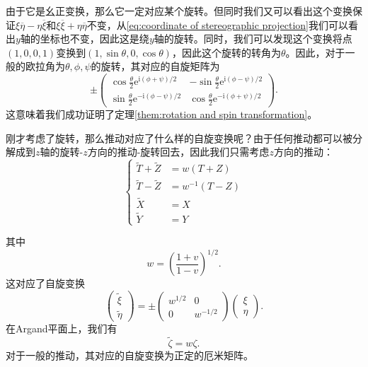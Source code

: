 由于它是幺正变换，那么它一定对应某个旋转。但同时我们又可以看出这个变换保证$\xi \overline{\eta } -\eta \overline{\xi }$和$\xi \overline{\xi } +\eta \overline{\eta }$不变，从\ref{eq:coordinate of stereographic projection}我们可以看出$y$轴的坐标也不变，因此这是绕$y$轴的旋转。同时，我们可以发现这个变换将点$( 1,0,0,1)$变换到$( 1,\sin \theta ,0,\cos \theta )$，因此这个旋转的转角为$\theta $。因此，对于一般的欧拉角为$\theta ,\phi ,\psi $的旋转，其对应的自旋矩阵为
\begin{equation*}
	\pm \begin{pmatrix}
		\cos\frac{\theta }{2}\mathrm{e}^{\mathrm{i} (\phi +\psi )/2} & -\sin\frac{\theta }{2}\mathrm{e}^{\mathrm{i} (\phi -\psi )/2}\\
		\sin\frac{\theta }{2}\mathrm{e}^{-\mathrm{i} (\phi -\psi )/2} & \cos\frac{\theta }{2}\mathrm{e}^{-\mathrm{i} (\phi +\psi )/2}
	\end{pmatrix} .
\end{equation*}
这意味着我们成功证明了定理\ref{them:rotation and spin transformation}。



刚才考虑了旋转，那么推动对应了什么样的自旋变换呢？由于任何推动都可以被分解成到$z$轴的旋转-$z$方向的推动-旋转回去，因此我们只需考虑$z$方向的推动：
\begin{equation*}
	\begin{cases}
		\tilde{T} +\tilde{Z} & =w(T+Z)\\
		\tilde{T} -\tilde{Z} & =w^{-1} (T-Z)\\
		\tilde{X} & =X\\
		\tilde{Y} & =Y
	\end{cases}
\end{equation*}


其中
\begin{equation*}
	w=\left(\frac{1+v}{1-v}\right)^{1/2} .
\end{equation*}
这对应了自旋变换
\begin{equation*}
	\begin{pmatrix}
		\tilde{\xi }\\
		\tilde{\eta }
	\end{pmatrix} =\pm \begin{pmatrix}
		w^{1/2} & 0\\
		0 & w^{-1/2}
	\end{pmatrix}\begin{pmatrix}
		\xi \\
		\eta 
	\end{pmatrix} .
\end{equation*}
在Argand平面上，我们有
\begin{equation*}
	\tilde{\zeta } =w\zeta .
\end{equation*}
对于一般的推动，其对应的自旋变换为正定的厄米矩阵。


